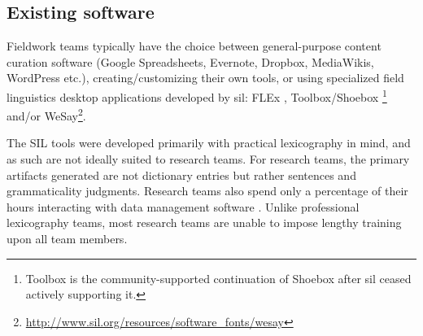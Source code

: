 \documentclass[11pt]{article}
\newcommand{\smalltodo}[2][]
    {\todo[caption={#2}, #1]
    {\tiny#2\normalsize}}
\begin{document}



\subsection{Existing software}
\label{sec:existing-software}

Fieldwork teams typically have the choice between general-purpose content
curation software (Google Spreadsheets, Evernote, Dropbox, MediaWikis,
WordPress etc.), creating/customizing their own tools, or using specialized
field linguistics desktop applications developed by \gls{sil}:  FLEx
\cite{sil-flex}, Toolbox/Shoebox%
\footnote{Toolbox is the community-supported continuation of Shoebox after
    \gls{sil} ceased actively supporting it.} %
\cite{sil-toolbox-info} and/or WeSay\footnote{\url{http://www.sil.org/resources/software\_fonts/wesay}}.

The SIL tools were developed primarily with practical 
lexicography in mind, and as such are not ideally suited to research teams. For
research teams, the primary artifacts generated are not dictionary entries but
rather sentences and grammaticality judgments.  Research teams also spend only
a percentage of their hours interacting with data management software
\cite{Butler:2007,rogers10,robinson07}. Unlike professional lexicography teams,
most research teams are unable to impose lengthy training upon all team members.%
\end{document}
